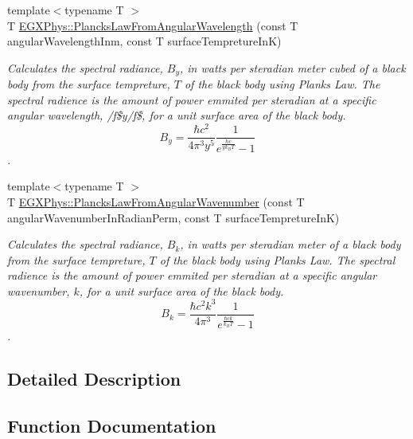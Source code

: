 \begin{DoxyCompactItemize}
{\footnotesize template$<$typename T $>$ }\\T \mbox{\hyperlink{group___e_g_x_phys-_electrodynamics-_black_body-_plancks_law_ga7322124727f968d28807e918c5eeb23f}{E\+G\+X\+Phys\+::\+Plancks\+Law\+From\+Angular\+Wavelength}} (const T angular\+Wavelength\+Inm, const T surface\+Tempreture\+InK)
\begin{DoxyCompactList}\small\item\em Calculates the spectral radiance, $B_{y}$, in watts per steradian meter cubed of a black body from the surface tempreture, $T$ of the black body using Plank\textquotesingle{}s Law. The spectral radience is the amount of power emmited per steradian at a specific angular wavelength, /f\$y/f\$, for a unit surface area of the black body. \[ B_{y} = \dfrac{\hbar c^2}{4\pi^3y^5} \dfrac{1}{e^{\frac{\hbar c}{y k_B T}} - 1} \]. \end{DoxyCompactList}\item 
{\footnotesize template$<$typename T $>$ }\\T \mbox{\hyperlink{group___e_g_x_phys-_electrodynamics-_black_body-_plancks_law_gaa3d3e0fdb77d25bdd40523f9975de902}{E\+G\+X\+Phys\+::\+Plancks\+Law\+From\+Angular\+Wavenumber}} (const T angular\+Wavenumber\+In\+Radian\+Perm, const T surface\+Tempreture\+InK)
\begin{DoxyCompactList}\small\item\em Calculates the spectral radiance, $B_{k}$, in watts per steradian meter of a black body from the surface tempreture, $T$ of the black body using Plank\textquotesingle{}s Law. The spectral radience is the amount of power emmited per steradian at a specific angular wavenumber, $k$, for a unit surface area of the black body. \[ B_{k} = \dfrac{\hbar c^2 k^3}{4\pi^3} \dfrac{1}{e^{\frac{\hbar c k}{k_B T}} - 1} \]. \end{DoxyCompactList}\end{DoxyCompactItemize}


\subsection{Detailed Description}


\subsection{Function Documentation}
\mbox{\label{group___e_g_x_phys-_electrodynamics-_black_body-_plancks_law_ga44d8dc3e072ffc7d860cd8f07463f091}} 
